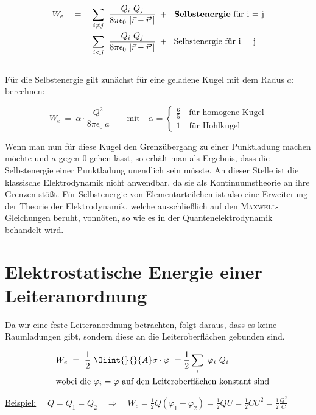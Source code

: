 \begin{align*}
W_e \quad &= \quad \sum_{i\neq j} \ \frac{Q_i \ Q_j}{8\pi\epsilon_0 \ |\vec{r}-\vec{r}'|} \; + \; \text{\textbf{ Selbstenergie} für i = j}\\
&= \quad \sum_{i<j} \ \frac{Q_i \ Q_j}{8\pi\epsilon_0 \ |\vec{r}-\vec{r}'|} \; + \; \text{ Selbstenergie für i = j}\\
\end{align*}
\ \\
Für die Selbstenergie gilt zunächst für eine geladene Kugel mit dem Radus $a$: berechnen:

\begin{equation*}
W_e \ = \ \alpha \cdot \frac{Q^2}{8\pi\epsilon_0 \ a} \qquad \text{mit} \quad \alpha = \begin{cases}
	\frac{6}{5} \quad \text{für homogene Kugel}\\
	1 \quad \text{für Hohlkugel}
  \end{cases}	
\end{equation*}	

Wenn man nun für diese Kugel den Grenzübergang zu einer Punktladung machen möchte und $a$ gegen 0 gehen lässt, so erhält man als Ergebnis, dass die Selbstenergie einer Punktladung unendlich sein müsste. An dieser Stelle ist die klassische Elektrodynamik nicht anwendbar, da sie als Kontinuumstheorie an ihre Grenzen stößt. Für Selbstenergie von Elementarteilchen ist also eine Erweiterung der Theorie der Elektrodynamik, welche ausschließlich auf den \textsc{Maxwell}-Gleichungen beruht, vonnöten, so wie es in der Quantenelektrodynamik behandelt wird.

\section{Elektrostatische Energie einer Leiteranordnung}

Da wir eine feste Leiteranordnung betrachten, folgt daraus, dass es keine Raumladungen gibt, sondern diese an die Leiteroberflächen gebunden sind.

\begin{align*}
& \quad W_e \ = \ \frac{1}{2} \ \Oiint{}{}{A} \sigma\cdot\varphi \  =  \frac{1}{2} \sum_i \ \varphi_i \ Q_i\\
&\quad \text{wobei die }\varphi_i = \varphi \text{ auf den Leiteroberflächen konstant sind}
\end{align*}

\underline{Beispiel:} $\quad Q=Q_1=Q_2 \quad\Rightarrow\quad  W_e =\frac{1}{2}Q(\varphi_1-\varphi_2 ) = \frac{1}{2}QU = \frac{1}{2}CU^2 = \frac{1}{2}\frac{Q^2}{C}$\

